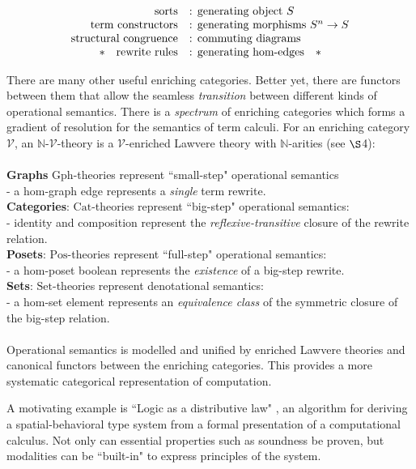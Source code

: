 \documentclass[a4paper,UKenglish]{article}
\theoremstyle{definition}
\newcommand{\Gph}{\mathrm{Gph}}
\newcommand{\Set}{\mathrm{Set}}
\newcommand{\Cat}{\mathrm{Cat}}
\newcommand{\Pos}{\mathrm{Pos}}
\newcommand{\NN}{\mathbb{N}}
\newcommand{\V}{\mathscr{V}}
\begin{document}
\[\begin{array}{rl}
\text{sorts} & \text{: generating object } S\\
\text{term constructors} & \text{: generating morphisms } S^n \to S\\
\text{structural congruence} & \text{: commuting diagrams}\\
\text{\textasteriskcentered \quad rewrite rules} & \text{: generating hom-edges\quad\textasteriskcentered}\\
\end{array}\]

There are many other useful enriching categories. Better yet, there are functors between them that allow the seamless \textit{transition} between different kinds of operational semantics. There is a \textit{spectrum} of enriching categories which forms a gradient of resolution for the semantics of term calculi. For an enriching category $\V$, an $\NN$-$\V$-theory is a $\V$-enriched Lawvere theory with $\NN$-arities (see $\S$4):\\\\
\textbf{Graphs} $\Gph$-theories represent ``small-step" operational semantics\\ - a hom-graph edge represents a \textit{single} term rewrite.\\
\textbf{Categories}: $\Cat$-theories represent ``big-step" operational semantics:\\ - identity and composition represent the \textit{reflexive-transitive} closure of the rewrite relation.\\
\textbf{Posets}: $\Pos$-theories represent ``full-step" operational semantics:\\ - a hom-poset boolean represents the \textit{existence} of a big-step rewrite.\\
\textbf{Sets}: $\Set$-theories represent denotational semantics:\\ - a hom-set element represents an \textit{equivalence class} of the symmetric closure of the big-step relation.\\\\
Operational semantics is modelled and unified by enriched Lawvere theories and canonical functors between the enriching categories. This provides a more systematic categorical representation of computation.

A motivating example is ``Logic as a distributive law" \cite{ladl}, an algorithm for deriving a spatial-behavioral type system from a formal presentation of a computational calculus. Not only can essential properties such as soundness be proven, but modalities can be ``built-in" to express principles of the system.
\end{document}
